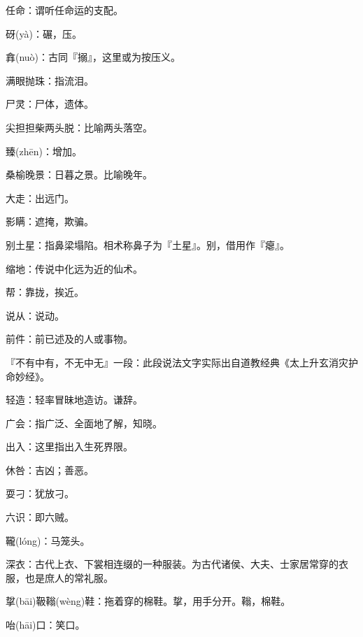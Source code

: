 \startbuffer[1725]
任命：谓听任命运的支配。
\stopbuffer


\startbuffer[1726]
砑(yà)：碾，压。
\stopbuffer


\startbuffer[1727]
搻(nuò)：古同『搦』，这里或为按压义。
\stopbuffer


\startbuffer[1728]
满眼抛珠：指流泪。
\stopbuffer


\startbuffer[1729]
尸灵：尸体，遗体。
\stopbuffer


\startbuffer[1730]
尖担担柴两头脱：比喻两头落空。
\stopbuffer


\startbuffer[1731]
臻(zhēn)：增加。
\stopbuffer


\startbuffer[1732]
桑榆晚景：日暮之景。比喻晚年。
\stopbuffer


\startbuffer[1733]
大走：出远门。
\stopbuffer


\startbuffer[1734]
影瞒：遮掩，欺骗。
\stopbuffer


\startbuffer[1735]
别土星：指鼻梁塌陷。相术称鼻子为『土星』。别，借用作『瘪』。
\stopbuffer


\startbuffer[1736]
缩地：传说中化远为近的仙术。
\stopbuffer


\startbuffer[1737]
帮：靠拢，挨近。
\stopbuffer


\startbuffer[1738]
说从：说动。
\stopbuffer


\startbuffer[1739]
前件：前已述及的人或事物。
\stopbuffer


\startbuffer[1740]
『不有中有，不无中无』一段：此段说法文字实际出自道教经典《太上升玄消灾护命妙经》。
\stopbuffer


\startbuffer[1741]
轻造：轻率冒昧地造访。谦辞。
\stopbuffer


\startbuffer[1742]
广会：指广泛、全面地了解，知晓。
\stopbuffer


\startbuffer[1743]
出入：这里指出入生死界限。
\stopbuffer


\startbuffer[1744]
休咎：吉凶；善恶。
\stopbuffer


\startbuffer[1745]
耍刁：犹放刁。
\stopbuffer


\startbuffer[1746]
六识：即六贼。
\stopbuffer


\startbuffer[1747]
䪊(lóng)：马笼头。
\stopbuffer


\startbuffer[1748]
深衣：古代上衣、下裳相连缀的一种服装。为古代诸侯、大夫、士家居常穿的衣服，也是庶人的常礼服。
\stopbuffer


\startbuffer[1749]
㧳(bāi)靸䩺(wèng)鞋：拖着穿的棉鞋。㧳，用手分开。䩺，棉鞋。
\stopbuffer


\startbuffer[1750]
咍(hāi)口：笑口。
\stopbuffer


